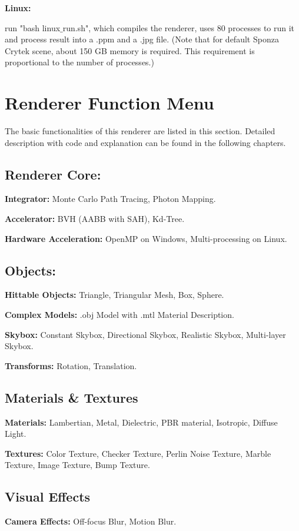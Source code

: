 \documentclass[utf8]{article}
\begin{document}
\noindent
\textbf{Linux:}

run "bash linux$\_$run.sh", which compiles the renderer, uses 80 processes to run it and process result into a .ppm and a .jpg file. (Note that for default Sponza Crytek scene, about 150 GB memory is required. This requirement is proportional to the number of processes.)

\section{Renderer Function Menu}
The basic functionalities of this renderer are listed in this section. Detailed description with code and explanation can be found in the following chapters.

\subsection{Renderer Core:}
\noindent
\textbf{Integrator: } Monte Carlo Path Tracing, Photon Mapping.

\noindent
\textbf{Accelerator: } BVH (AABB with SAH), Kd-Tree.

\noindent
\textbf{Hardware Acceleration: } OpenMP on Windows, Multi-processing on Linux.

\subsection{Objects: }
\noindent
\textbf{Hittable Objects: } Triangle, Triangular Mesh, Box, Sphere.

\noindent
\textbf{Complex Models: } .obj Model with .mtl Material Description.

\noindent
\textbf{Skybox: } Constant Skybox, Directional Skybox, Realistic Skybox, Multi-layer Skybox.

\noindent
\textbf{Transforms: } Rotation, Translation.

\subsection{Materials \& Textures}
\noindent
\textbf{Materials: } Lambertian, Metal, Dielectric, PBR material, Isotropic, Diffuse Light.

\noindent
\textbf{Textures: } Color Texture, Checker Texture, Perlin Noise Texture, Marble Texture, Image Texture, Bump Texture.

\subsection{Visual Effects}
\noindent
\textbf{Camera Effects: } Off-focus Blur, Motion Blur.
\end{document}
